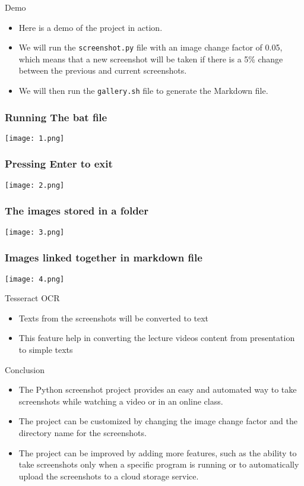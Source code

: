 \documentclass{beamer}
\begin{document}
\begin{frame}{Demo}
  \begin{itemize}
    \item Here is a demo of the project in action.
    \item We will run the \texttt{screenshot.py} file with an image change factor of 0.05, which means that a new screenshot will be taken if there is a 5\% change between the previous and current screenshots.
    \item We will then run the \texttt{gallery.sh} file to generate the Markdown file.
  \end{itemize}

\end{frame}
\begin{frame}
	\frametitle{Running The bat file}
	\begin{center}
		\texttt{[image: 1.png]}
	\end{center}
\end{frame}
\begin{frame}
	\frametitle{Pressing Enter to exit}
	\begin{center}
		\texttt{[image: 2.png]}
	\end{center}
\end{frame}
\begin{frame}
	\frametitle{The images stored in a folder}
	\begin{center}
		\texttt{[image: 3.png]}
	\end{center}
\end{frame}
\begin{frame}
	\frametitle{Images linked together in markdown file}
	\begin{center}
		\texttt{[image: 4.png]}
	\end{center}
\end{frame}

\begin{frame}{Tesseract OCR}
	\begin{itemize}
		\item Texts from the screenshots will be converted to text
		\item This feature help in converting the lecture videos content from presentation to simple texts
	\end{itemize}
\end{frame}
\begin{frame}{Conclusion}
  \begin{itemize}
    \item The Python screenshot project provides an easy and automated way to take screenshots while watching a video or in an online class.
    \item The project can be customized by changing the image change factor and the directory name for the screenshots.
    \item The project can be improved by adding more features, such as the ability to take screenshots only when a specific program is running or to automatically upload the screenshots to a cloud storage service.
  \end{itemize}
\end{frame}
\end{document}
